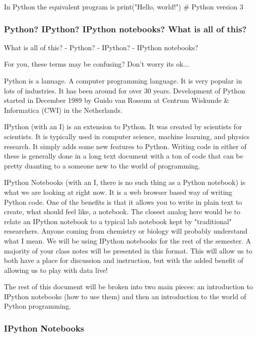 \documentclass[11pt]{article}
\begin{document}
In Python the equivalent program is print("Hello, world!") \# Python
version 3

    \subsubsection{Python? IPython? IPython notebooks? What is all of
this?}\label{python-ipython-ipython-notebooks-what-is-all-of-this}

    What is all of this? - Python? - IPython? - IPython notebooks?

For you, these terms may be confusing? Don't worry its ok...

Python is a lanuage. A computer programming language. It is very popular
in lots of industries. It has been around for over 30 years. Development
of Python started in December 1989 by Guido van Rossum at Centrum
Wiskunde \& Informatica (CWI) in the Netherlands.

IPython (with an I) is an extension to Python. It was created by
scientists for scientists. It is typically used in computer science,
machine learning, and physics research. It simply adds some new features
to Python. Writing code in either of these is generally done in a long
text document with a ton of code that can be pretty duanting to a
someone new to the world of programming.

IPython Notebooks (with an I, there is no such thing as a Python
notebook) is what we are looking at right now. It is a web browser based
way of writing Python code. One of the benefits is that it allows you to
write in plain text to create, what should feel like, a notebook. The
closest analog here would be to relate an IPython notebook to a typical
lab notebook kept by "traditional" researchers. Anyone coming from
chemistry or biology will probably understand what I mean. We will be
using IPython notebooks for the rest of the semester. A majority of your
class notes will be presented in this format. This will allow us to both
have a place for discussion and instruction, but with the added benefit
of allowing us to play with data live!

The rest of this document will be broken into two main pieces: an
introduction to IPython notebooks (how to use them) and then an
introduction to the world of Python programming.

    \subsubsection{IPython Notebooks}\label{ipython-notebooks}
\end{document}
